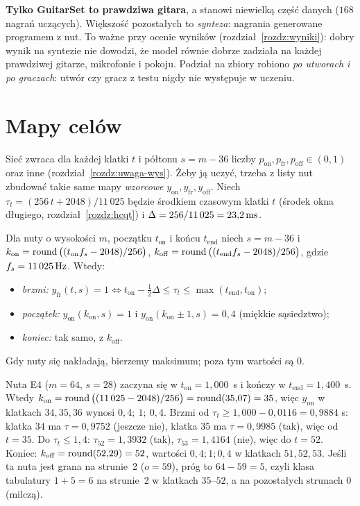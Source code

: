 \begin{pulapka}
\textbf{Tylko GuitarSet to prawdziwa gitara}, a stanowi niewielką część danych ($168$ nagrań uczących). Większość pozostałych to \emph{synteza}: nagrania generowane programem z nut. To ważne przy ocenie wyników (rozdział~\ref{rozdz:wyniki}): dobry wynik na syntezie nie dowodzi,
że model równie dobrze zadziała na każdej prawdziwej gitarze, mikrofonie i pokoju. Podział na zbiory robiono \emph{po utworach i po graczach}: utwór czy gracz z testu nigdy nie występuje w uczeniu.
\end{pulapka}

\section{Mapy celów}

Sieć zwraca dla każdej klatki $t$ i półtonu $s=m-36$ liczby $p_\mathrm{on},p_\mathrm{fr},p_\mathrm{off}\in(0,1)$ oraz inne (rozdział~\ref{rozdz:uwaga-wys}). Żeby ją uczyć, trzeba z listy nut zbudować takie same mapy \emph{wzorcowe}
$y_\mathrm{on},y_\mathrm{fr},y_\mathrm{off}$. Niech $\tau_t=(256\,t+2048)/11\,025$ będzie środkiem czasowym klatki $t$ (środek okna długiego, rozdział~\ref{rozdz:hcqt}) i $\Delta=256/11\,025=23{,}2\,\mathrm{ms}$.

\begin{definicja}\label{def:mapy-celow}
Dla nuty o wysokości $m$, początku $t_\mathrm{on}$ i końcu $t_\mathrm{end}$ niech $s=m-36$ i $k_\mathrm{on}=\operatorname{round}\big((t_\mathrm{on}f_s-2048)/256\big)$, $k_\mathrm{off}=\operatorname{round}\big((t_\mathrm{end}f_s-2048)/256\big)$, gdzie $f_s=11\,025\,\mathrm{Hz}$. Wtedy:
\begin{itemize}
\item \emph{brzmi:} $y_\mathrm{fr}(t,s)=1\iff t_\mathrm{on}-\tfrac12\Delta\le\tau_t\le\max(t_\mathrm{end},t_\mathrm{on})$;
\item \emph{początek:} $y_\mathrm{on}(k_\mathrm{on},s)=1$ i $y_\mathrm{on}(k_\mathrm{on}\pm1,s)=0{,}4$ (miękkie sąsiedztwo);
\item \emph{koniec:} tak samo, z $k_\mathrm{off}$.
\end{itemize}
Gdy nuty się nakładają, bierzemy maksimum; poza tym wartości są $0$.
\end{definicja}

\begin{przyklad}\label{prz:mapy-e4}
Nuta E4 ($m=64$, $s=28$) zaczyna się w $t_\mathrm{on}=1{,}000$~s i kończy w $t_\mathrm{end}=1{,}400$~s. Wtedy
$k_\mathrm{on}=\operatorname{round}\big((11\,025-2048)/256\big)=\operatorname{round}(35{,}07)=35$, więc $y_\mathrm{on}$ w klatkach $34,35,36$ wynosi $0{,}4;\ 1;\ 0{,}4$.
Brzmi od $\tau_t\ge1{,}000-0{,}0116=0{,}9884$ s: klatka $34$ ma $\tau=0{,}9752$ (jeszcze nie), klatka $35$ ma $\tau=0{,}9985$ (tak), więc od $t=35$.
Do $\tau_t\le1{,}4$: $\tau_{52}=1{,}3932$ (tak), $\tau_{53}=1{,}4164$ (nie), więc do $t=52$. Koniec: $k_\mathrm{off}=\operatorname{round}(52{,}29)=52$, wartości $0{,}4;1;0{,}4$ w klatkach $51,52,53$.
Jeśli ta nuta jest grana na strunie~2 ($o=59$), próg to $64-59=5$, czyli klasa tabulatury $1+5=6$ na strunie~2 w klatkach $35$--$52$, a na pozostałych strunach $0$ (milczą).
\end{przyklad}

